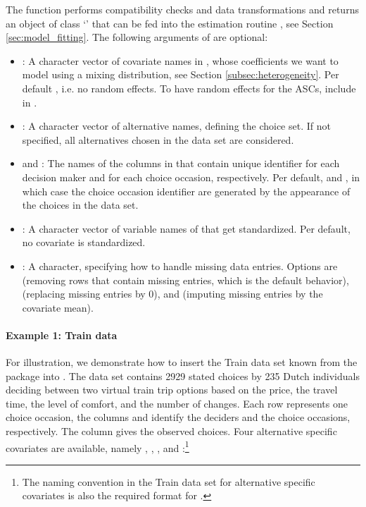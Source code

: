 \documentclass[article]{jss}
\newcommand{\class}[1]{`\code{#1}'}
\newcommand{\fct}[1]{\code{#1()}}
\begin{document}
The function performs compatibility checks and data transformations and returns an object of class \class{RprobitB\_data} that can be fed into the estimation routine \fct{fit\_model}, see Section \ref{sec:model_fitting}. The following arguments of \fct{prepare\_data} are optional:
\begin{itemize}
  \item {}: A character vector of covariate names in , whose coefficients we want to model using a mixing distribution, see Section \ref{subsec:heterogeneity}. Per default , i.e. no random effects. To have random effects for the ASCs, include  in .
  \item {}: A character vector of alternative names, defining the choice set. If not specified, all alternatives chosen in the data set are considered.
  \item {} and : The names of the columns in  that contain unique identifier for each decision maker and for each choice occasion, respectively. Per default,  and , in which case the choice occasion identifier are generated by the appearance of the choices in the data set.
  \item {}: A character vector of variable names of  that get standardized. Per default, no covariate is standardized.
  \item {}: A character, specifying how to handle missing data entries. Options are  (removing rows that contain missing entries, which is the default behavior),  (replacing missing entries by 0), and  (imputing missing entries by the covariate mean).
\end{itemize}

\paragraph{Example 1: Train data} For illustration, we demonstrate how to insert the Train data set known from the  package into . The data set contains 2929 stated choices by 235 Dutch individuals deciding between two virtual train trip options based on the price, the travel time, the level of comfort, and the number of changes. Each row represents one choice occasion, the columns  and  identify the deciders and the choice occasions, respectively. The column  gives the observed choices. Four alternative specific covariates are available, namely , , , and :\footnote{The naming convention  in the Train data set for alternative specific covariates is also the required format for .}
\end{document}
